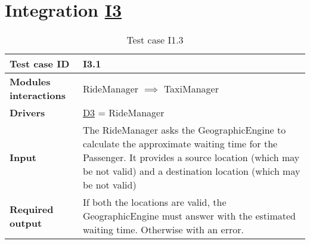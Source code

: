 \section{Integration \hyperref[I3]{I3} \label{int_I3}}

\begin{table}[H]
\begin{tabular}{ l | p{} }
\textbf{Test case ID} & I3.1 \\ \hline
\textbf{Modules interactions} & RideManager $\implies$ TaxiManager \\ \hline
\textbf{Drivers} &  \hyperref[D3]{D3} = RideManager \\ \hline
\textbf{Input} & The RideManager asks the GeographicEngine to calculate the approximate waiting time for the Passenger. It provides a source location (which may be not valid) and a destination location (which may be not valid) \\ \hline
\textbf{Required output} & If both the locations are valid, the GeographicEngine must answer with the estimated waiting time. Otherwise with an error.
\end{tabular}
\caption{Test case I1.3}
\end{table}